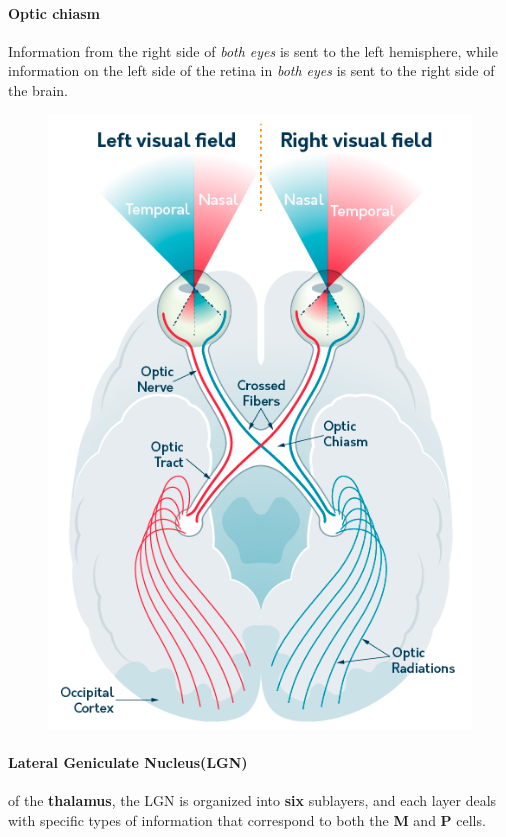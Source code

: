 \documentclass{article}
\begin{document}
	\paragraph{Optic chiasm} Information from the right side of \emph{both eyes} is sent to the left hemisphere, while information on the left side of the retina in \emph{both eyes} is sent to the right side of the brain.
	\begin{figure}
		\centering
		\includegraphics[width=\linewidth]{pic/visualChiasm}
	\end{figure}
	\paragraph{Lateral Geniculate Nucleus(LGN)} of the \textbf{thalamus}, the LGN is organized into \textbf{six} sublayers, and each layer deals with specific types of information that correspond to both the \textbf{M} and \textbf{P} cells.
\end{document}

